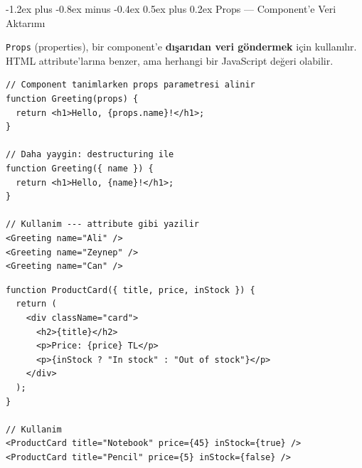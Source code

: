 \documentclass[12pt, a4paper]{article}
\makeatletter
\renewcommand{\subsection}{%
  \@startsection{subsection}{2}{\z@}%
    {-1.2ex plus -0.8ex minus -0.4ex}%
    {0.5ex plus 0.2ex}%
    {\normalfont\large\bfseries\sffamily\color{secondary}}%
}
\makeatother
\begin{document}
\newpage
\subsection{Props --- Component'e Veri Aktarımı}

\texttt{Props} (properties), bir component'e \textbf{dışarıdan veri göndermek}
için kullanılır. HTML attribute'larına benzer, ama herhangi bir
JavaScript değeri olabilir.

\vspace{6pt}

\begin{tcolorbox}[enhanced, colback=codebg, colframe=gray!30,
    colbacktitle=primary!85!black, coltitle=white, arc=4pt,
    title={\sffamily\bfseries\small Props Kullanımı}]
\begin{lstlisting}[style=jsxstyle]
// Component tanimlarken props parametresi alinir
function Greeting(props) {
  return <h1>Hello, {props.name}!</h1>;
}

// Daha yaygin: destructuring ile
function Greeting({ name }) {
  return <h1>Hello, {name}!</h1>;
}

// Kullanim --- attribute gibi yazilir
<Greeting name="Ali" />
<Greeting name="Zeynep" />
<Greeting name="Can" />
\end{lstlisting}
\end{tcolorbox}

\vspace{6pt}

\begin{tcolorbox}[enhanced, colback=codebg, colframe=gray!30,
    colbacktitle=primary!85!black, coltitle=white, arc=4pt,
    title={\sffamily\bfseries\small Birden Fazla Prop}]
\begin{lstlisting}[style=jsxstyle]
function ProductCard({ title, price, inStock }) {
  return (
    <div className="card">
      <h2>{title}</h2>
      <p>Price: {price} TL</p>
      <p>{inStock ? "In stock" : "Out of stock"}</p>
    </div>
  );
}

// Kullanim
<ProductCard title="Notebook" price={45} inStock={true} />
<ProductCard title="Pencil" price={5} inStock={false} />
\end{lstlisting}
\end{tcolorbox}

\vspace{6pt}
\end{document}
